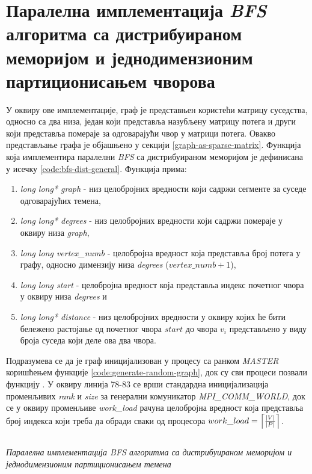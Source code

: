 \section{Паралелна имплементација \textit{BFS} алгоритма са дистрибуираном меморијом и једнодимензионим партиционисањем чворова}
У оквиру ове имплементације, граф је представњен користећи матрицу суседства, односно са два низа, један који представља назубљену матрицу потега и други који представља помераје за одговарајући чвор у матрици потега. Овакво представљање графа је објашњено у секцији \ref{graph-as-sparse-matrix}. Функција која имплементира паралелни \textit{BFS} са дистрибуираном меморијом је дефинисана у исечку \ref{code:bfs-dist-general}. Функција  прима:
\begin{enumerate}
    \item \textit{long long* graph} - низ целобројних вредности који садржи сегменте за суседе одговарајућих темена,
    \item \textit{long long* degrees} - низ целобројних вредности који садржи помераје у оквиру низа \textit{graph},
    \item \textit{long long vertex\_numb} - целобројна вредност која представља број потега у графу, односно димензију низа \textit{degrees} ($\textit{vertex\_numb} + 1$),
    \item \textit{long long start} - целобројна вредност која представља индекс почетног чвора у оквиру низа \textit{degrees} и
    \item \textit{long long* distance} - низ целобројних вредности у оквиру којих ће бити бележено растојање од почетног чвора $start$ до чвора $v_i$ представљено у виду броја суседа који деле ова два чвора.
\end{enumerate}

\par
Подразумева се да је граф иницијализован у процесу са ранком \textit{MASTER} коришћењем функције \ref{code:generate-random-graph}, док су сви процеси позвали функцију . У оквиру линија 78-83 се врши стандардна иницијализација променљивих \textit{rank} и \textit{size} за генерални комуникатор \textit{MPI\_COMM\_WORLD}, док се у оквиру променљиве \textit{work\_load} рачуна целобројна вредност која представља број индекса који треба да обради сваки од процесора $work\_load = \ceil*{\frac{|V|}{|P|}}$. 

\begin{listing}[H]
\centering
\inputminted[fontsize={\fontsize{5}{5}\selectfont},firstline=71,lastline=158]{c}{kodovi/bfs-dist-general-1d.c}
\caption{\textit{Паралелна имплементација \textit{BFS} алгоритма са дистрибуираном меморијом и једнодимензионим партиционисањем темена}}
\label{code:bfs-dist-general}
\end{listing}

